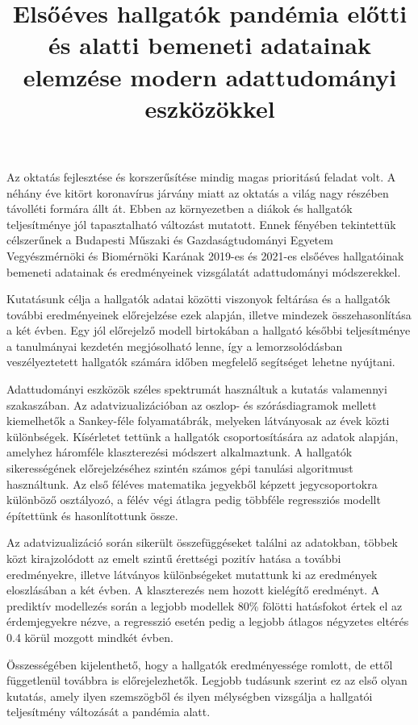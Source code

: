 \documentclass[12pt]{article}
\title{Elsőéves hallgatók pandémia előtti és alatti bemeneti adatainak elemzése modern adattudományi eszközökkel}
\begin{document}
\maketitle



Az oktatás fejlesztése és korszerűsítése mindig magas prioritású feladat volt. A néhány éve kitört koronavírus járvány miatt az oktatás a világ nagy részében távolléti formára állt át. Ebben az környezetben a diákok és hallgatók teljesítménye jól tapasztalható változást mutatott. Ennek fényében tekintettük célszerűnek a Budapesti Műszaki és Gazdaságtudományi Egyetem Vegyészmérnöki és Biomérnöki Karának 2019-es és 2021-es elsőéves hallgatóinak bemeneti adatainak és eredményeinek vizsgálatát adattudományi módszerekkel.

Kutatásunk célja a hallgatók adatai közötti viszonyok feltárása és a hallgatók további eredményeinek előrejelzése ezek alapján, illetve mindezek összehasonlítása a két évben. Egy jól előrejelző modell birtokában a hallgató későbbi teljesítménye a tanulmányai kezdetén megjósolható lenne, így a lemorzsolódásban veszélyeztetett hallgatók számára időben megfelelő segítséget lehetne  nyújtani.

Adattudományi eszközök széles spektrumát használtuk a kutatás valamennyi szakaszában. Az adatvizualizációban az oszlop- és szórásdiagramok mellett kiemelhetők a Sankey-féle folyamatábrák, melyeken látványosak az évek közti különbségek. Kísérletet tettünk a hallgatók csoportosítására az adatok alapján, amelyhez háromféle klaszterezési módszert alkalmaztunk. A hallgatók sikerességének előrejelzéséhez szintén számos gépi tanulási algoritmust használtunk. Az első féléves matematika jegyekből képzett jegycsoportokra különböző osztályozó, a félév végi átlagra pedig többféle regressziós modellt építettünk és hasonlítottunk össze.

Az adatvizualizáció során sikerült összefüggéseket találni az adatokban, többek közt kirajzolódott az emelt szintű érettségi pozitív hatása a további eredményekre, illetve látványos különbségeket mutattunk ki az eredmények eloszlásában a két évben. A klaszterezés nem hozott kielégítő eredményt. A prediktív modellezés során a legjobb modellek 80\% fölötti hatásfokot értek el az érdemjegyekre nézve, a regresszió esetén pedig a legjobb átlagos négyzetes eltérés 0.4 körül mozgott mindkét évben.

Összességében kijelenthető, hogy a hallgatók eredményessége romlott, de ettől függetlenül továbbra is előrejelezhetők. Legjobb tudásunk szerint ez az első olyan kutatás, amely ilyen szemszögből és ilyen mélységben vizsgálja a hallgatói teljesítmény változását a pandémia alatt.
\end{document}

